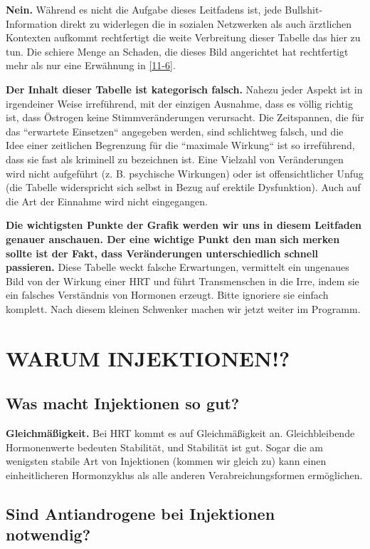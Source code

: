 \documentclass{article}
\begin{document}
\textbf{Nein.} Während es nicht die Aufgabe dieses Leitfadens ist, jede Bullshit-Information direkt zu widerlegen die in sozialen Netzwerken als auch ärztlichen Kontexten aufkommt rechtfertigt die weite Verbreitung dieser Tabelle das hier zu tun. Die schiere Menge an Schaden, die dieses Bild angerichtet hat rechtfertigt mehr als nur eine Erwähnung in \ref{11-6}.

\textbf{Der Inhalt dieser Tabelle ist kategorisch falsch.} Nahezu jeder Aspekt ist in irgendeiner Weise irreführend, mit der einzigen Ausnahme, dass es völlig richtig ist, dass Östrogen keine Stimmveränderungen verursacht. Die Zeitspannen, die für das “erwartete Einsetzen“ angegeben werden, sind schlichtweg falsch, und die Idee einer zeitlichen Begrenzung für die “maximale Wirkung“ ist so irreführend, dass sie fast als kriminell zu bezeichnen ist. Eine Vielzahl von Veränderungen wird nicht aufgeführt (z. B. psychische Wirkungen) oder ist offensichtlicher Unfug (die Tabelle widerspricht sich selbst in Bezug auf erektile Dysfunktion). Auch auf die Art der Einnahme wird nicht eingegangen.

\textbf{Die wichtigsten Punkte der Grafik werden wir uns in diesem Leitfaden genauer anschauen. Der eine wichtige Punkt den man sich merken sollte ist der Fakt, dass Veränderungen unterschiedlich schnell passieren.} Diese Tabelle weckt falsche Erwartungen, vermittelt ein ungenaues Bild von der Wirkung einer HRT und führt Transmenschen in die Irre, indem sie ein falsches Verständnis von Hormonen erzeugt. Bitte ignoriere sie einfach komplett. Nach diesem kleinen Schwenker machen wir jetzt weiter im Programm.

\section{WARUM INJEKTIONEN!?}

\subsection{Was macht Injektionen so gut?}

\textbf{Gleichmäßigkeit.} Bei HRT kommt es auf Gleichmäßigkeit an. Gleichbleibende Hormonenwerte bedeuten Stabilität, und Stabilität ist gut. Sogar die am wenigsten stabile Art von Injektionen (kommen wir gleich zu) kann einen einheitlicheren Hormonzyklus als alle anderen Verabreichungsformen ermöglichen.

\subsection{Sind Antiandrogene bei Injektionen notwendig?}
\end{document}
